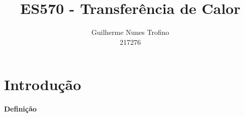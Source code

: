 \documentclass{article}
\title{ES570 - Transferência de Calor}
\author{Guilherme Nunes Trofino\\217276}
\begin{document}
    \maketitle
\newpage

    \tableofcontents
\newpage

    \section{Introdução}
        \paragraph{Definição}

\begin{multicols}{2}
    \raggedcolumns


\end{multicols}
\end{document}
